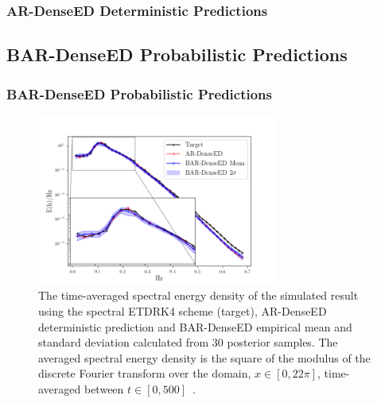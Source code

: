 \documentclass{beamer}
\theoremstyle{remark}
\begin{document}
\begin{frame}
\frametitle{AR-DenseED Deterministic Predictions}

\begin{table}[H]
    \caption{Wall-clock time for both spectral ETDRK4 scheme and AR-DenseED to simulate $5000$ time-steps of the Kuramoto-Sivashinsky system.
    Wall-clock time estimates were obtained by averaging $10$ independent simulation run times.}
    \label{tab:ks-wallclock}
\end{table}

\end{frame}


\subsection{BAR-DenseED Probabilistic Predictions}

\begin{frame}
\frametitle{BAR-DenseED Probabilistic Predictions}

\begin{figure}[H]
    \centering
    \includegraphics[width=0.7\textwidth]{Fig07.png}
    \caption{The time-averaged spectral energy density of the simulated result using the spectral ETDRK4 scheme (target), AR-DenseED deterministic prediction and BAR-DenseED empirical mean and standard deviation calculated from $30$ posterior samples.
    The averaged spectral energy density is the square of the modulus of the discrete Fourier transform over the domain, $x\in[0,22\pi]$, time-averaged between $t\in[0,500]$~\cite{brummitt2009search}.}
    \label{fig:ks-esd}
\end{figure}
\end{frame}
\end{document}
